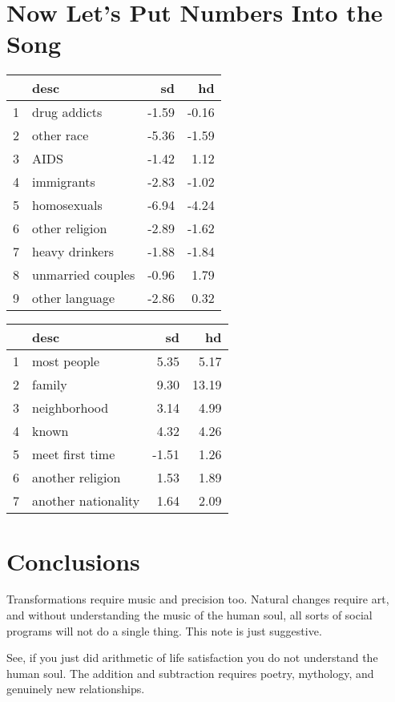 \documentclass{amsart}
\begin{document}
\section{Now Let's Put Numbers Into the Song}

\begin{table}[ht]
\centering
\begin{tabular}{rlrr}
  \hline
 & desc & sd & hd \\ 
  \hline
1 & drug addicts & -1.59 & -0.16 \\ 
  2 & other race & -5.36 & -1.59 \\ 
  3 & AIDS & -1.42 & 1.12 \\ 
  4 & immigrants & -2.83 & -1.02 \\ 
  5 & homosexuals & -6.94 & -4.24 \\ 
  6 & other religion & -2.89 & -1.62 \\ 
  7 & heavy drinkers & -1.88 & -1.84 \\ 
  8 & unmarried couples & -0.96 & 1.79 \\ 
  9 & other language & -2.86 & 0.32 \\ 
   \hline
\end{tabular}
\end{table}


\begin{table}[ht]
\centering
\begin{tabular}{rlrr}
  \hline
 & desc & sd & hd \\ 
  \hline
1 & most people & 5.35 & 5.17 \\ 
  2 & family & 9.30 & 13.19 \\ 
  3 & neighborhood & 3.14 & 4.99 \\ 
  4 & known & 4.32 & 4.26 \\ 
  5 & meet first time & -1.51 & 1.26 \\ 
  6 & another religion & 1.53 & 1.89 \\ 
  7 & another nationality & 1.64 & 2.09 \\ 
   \hline
\end{tabular}
\end{table}

\section{Conclusions}

Transformations require music and precision too.  Natural changes require art, and without understanding the music of the human soul, all sorts of social programs will not do a single thing.  This note is just suggestive.  

See, if you just did arithmetic of life satisfaction you do not understand the human soul.  The addition and subtraction requires poetry, mythology, and genuinely new relationships.  
\end{document}
